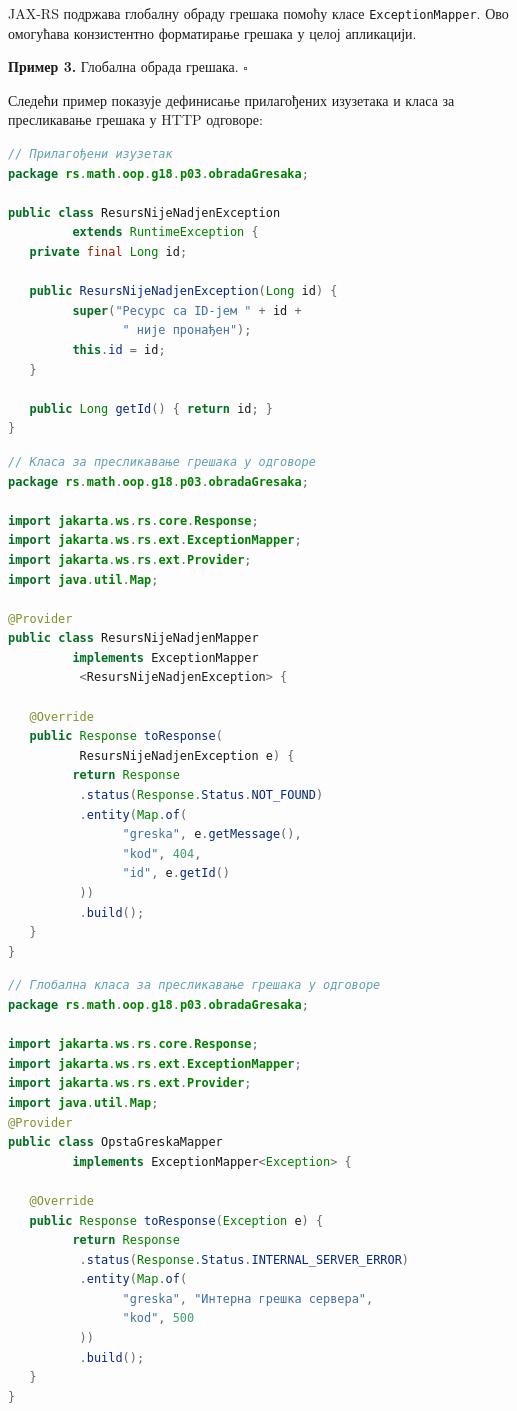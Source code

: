 JAX-RS подржава глобалну обраду грешака помоћу класе \texttt{ExceptionMapper}. Ово омогућава конзистентно форматирање грешака у целој апликацији.


\bigskip

\noindent \textbf{Пример 3.} Глобална обрада грешака. $\square$

\medskip

Следећи пример показује дефинисање прилагођених изузетака и класа за пресликавање грешака у HTTP одговоре:


\begin{lstlisting}[language=Java]
// Прилагођени изузетак
package rs.math.oop.g18.p03.obradaGresaka;
 
public class ResursNijeNadjenException
         extends RuntimeException {
   private final Long id;
 
   public ResursNijeNadjenException(Long id) {
         super("Ресурс са ID-јем " + id +
                " није пронађен");
         this.id = id;
   }
 
   public Long getId() { return id; }
}
\end{lstlisting}


\begin{lstlisting}[language=Java]
// Класа за пресликавање грешака у одговоре
package rs.math.oop.g18.p03.obradaGresaka;
 
import jakarta.ws.rs.core.Response;
import jakarta.ws.rs.ext.ExceptionMapper;
import jakarta.ws.rs.ext.Provider;
import java.util.Map;
 
@Provider
public class ResursNijeNadjenMapper
         implements ExceptionMapper
          <ResursNijeNadjenException> {
 
   @Override
   public Response toResponse(
          ResursNijeNadjenException e) {
         return Response
          .status(Response.Status.NOT_FOUND)
          .entity(Map.of(
                "greska", e.getMessage(),
                "kod", 404,
                "id", e.getId()
          ))
          .build();
   }
}
\end{lstlisting}


\begin{lstlisting}[language=Java]
// Глобална класа за пресликавање грешака у одговоре
package rs.math.oop.g18.p03.obradaGresaka;
 
import jakarta.ws.rs.core.Response;
import jakarta.ws.rs.ext.ExceptionMapper;
import jakarta.ws.rs.ext.Provider;
import java.util.Map;
@Provider
public class OpstaGreskaMapper
         implements ExceptionMapper<Exception> {
 
   @Override
   public Response toResponse(Exception e) {
         return Response
          .status(Response.Status.INTERNAL_SERVER_ERROR)
          .entity(Map.of(
                "greska", "Интерна грешка сервера",
                "kod", 500
          ))
          .build();
   }
}
\end{lstlisting}


